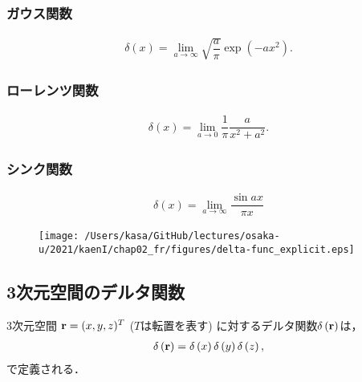 \subsubsection{ガウス関数}
%
\begin{align}
 \delta \left(x\right) = \lim_{a \to \infty} \sqrt{\dfrac{a}{\pi}}\exp\left(-ax^2\right).
\end{align}
%
\subsubsection{ローレンツ関数}
%
\begin{align}
 \delta \left(x\right) = \lim_{a\to 0} \dfrac{1}{\pi}\dfrac{a}{x^{2}+a^{2}}.
\end{align}
%
\subsubsection{シンク関数}
%
\begin{align}
 \delta\left(x\right) = \lim_{a\to \infty} \dfrac{\sin ax}{\pi x}
\end{align}
%
\begin{figure}[htbp]
 \centering
 \texttt{[image: /Users/kasa/GitHub/lectures/osaka-u/2021/kaenI/chap02\_fr/figures/delta-func\_explicit.eps]} 
\end{figure}
%
\subsection{3次元空間のデルタ関数}
%
3次元空間
${\bf r} = (x,y,z)^{T}$ ($T$は転置を表す)
に対するデルタ関数$\delta\left({\bf r}\right)$は，
\begin{align}
 \delta\left({\bf r}\right) = \delta\left(x\right) \delta\left(y\right) \delta\left(z\right), 
\end{align}
で定義される．
%
%
